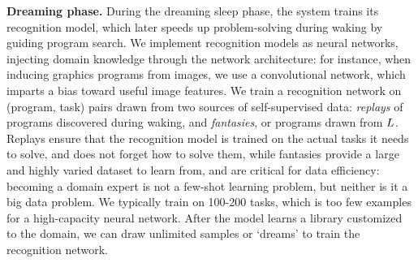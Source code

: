 \documentclass[12pt]{article}
\begin{document}

{\bf Dreaming phase.} During the dreaming sleep phase, the system trains its recognition model, which later speeds up problem-solving during waking
by guiding program search.
We implement recognition models as neural networks,
injecting domain knowledge through the network architecture:
for instance, when inducing graphics programs from images, we use a convolutional network, which imparts a bias toward useful image features.
We train a recognition network on %
(program, task) pairs drawn from two
sources of self-supervised data: \emph{replays} of programs discovered
during waking, and \emph{fantasies}, or programs drawn from $L$.
Replays ensure that the recognition model is trained on the actual
tasks it needs to solve, and does not forget how to solve them,
while fantasies provide a large and highly
varied dataset to learn from,
and are critical for data efficiency:
becoming a domain expert is not a few-shot learning problem,
but neither is it a big data problem.
We typically train \system on 100-200 tasks,
which is too few examples for a high-capacity neural network.
After the model learns a library customized to the domain,
we can draw unlimited samples or `dreams' to train the recognition network.
\end{document}
